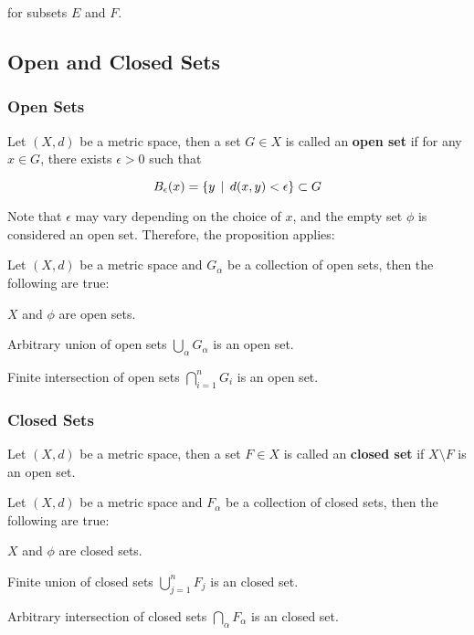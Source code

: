\documentclass[a4paper,12pt]{article}
\begin{document}
for subsets $E$ and $F$.

\subsection{Open and Closed Sets}
\subsubsection{Open Sets}
\begin{dft}
  Let $(X,d)$ be a metric space, then a set $G\in X$ is called an \textbf{open set} if for any $x\in G$, there exists $\epsilon>0$ such that

  $$B_{\epsilon}(x)=\left\{ y\,\mid\, d(x,y)<\epsilon\right\}\subset G$$
\end{dft}\n

Note that $\epsilon$ may vary depending on the choice of $x$, and the empty set $\phi$ is considered an open set. Therefore, the proposition applies:\n

\begin{pst}
  Let $(X,d)$ be a metric space and $G_{\alpha}$ be a collection of open sets, then the following are true:

  \begin{alist}
    \item $X$ and $\phi$ are open sets.
    \item Arbitrary union of open sets $\bigcup_{\alpha}G_{\alpha}$ is an open set.
    \item Finite intersection of open sets $\bigcap_{i=1}^{n}G_{i}$ is an open set.
  \end{alist}
\end{pst}

\subsubsection{Closed Sets}
\begin{dft}
  Let $(X,d)$ be a metric space, then a set $F\in X$ is called an \textbf{closed set} if $X\setminus F$ is an open set.
\end{dft}\n

\begin{pst}
  Let $(X,d)$ be a metric space and $F_{\alpha}$ be a collection of closed sets, then the following are true:

  \begin{alist}
    \item $X$ and $\phi$ are closed sets.
    \item Finite union of closed sets $\bigcup_{j=1}^{n}F_{j}$ is an closed set.
    \item Arbitrary intersection of closed sets $\bigcap_{\alpha}F_{\alpha}$ is an closed set.
  \end{alist}
\end{pst}\n
\end{document}
